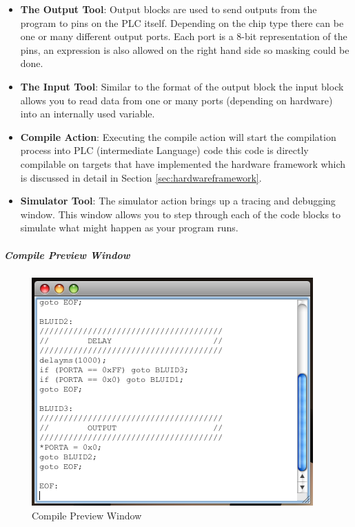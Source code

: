 \begin{itemize}
\item \textbf{The Output Tool}: Output blocks are used to send outputs from the program to pins on the PLC itself. Depending on the chip type there can be one or many different output ports. Each port is a 8-bit representation of the pins, an expression is also allowed on the right hand side so masking could be done.

\item \textbf{The Input Tool}: Similar to the format of the output block the input block allows you to read data from one or many ports (depending on hardware) into an internally used variable.

\item \textbf{Compile Action}: Executing the compile action will start the compilation process into PLC  (intermediate Language) code this code is directly compilable on targets that have implemented the hardware framework which is discussed in detail in Section \ref{sec:hardwareframework}.

\item \textbf{Simulator Tool}: The simulator action brings up a tracing and debugging window. This window allows you to step through each of the code blocks to simulate what might happen as your program runs.
\end{itemize}

\subparagraph{Compile Preview Window}

\begin{figure}[htp]
    \centering
    \includegraphics[width=\imgmedium]{./images/plcedit_compile.png}
    \caption{Compile Preview Window}
    \label{fig:plcedit_compile}
\end{figure}

